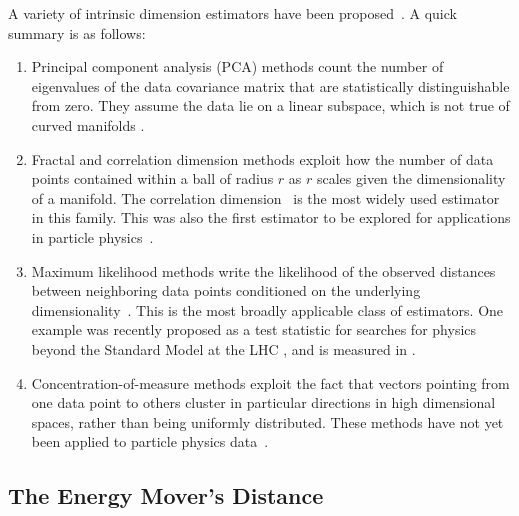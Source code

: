 A variety of intrinsic dimension estimators have been proposed~\cite{10.1109/T-C.1971.223208, PhysRevLett.50.346, NIPS2004_74934548, CERUTI20142569, Albergante:2019ijcnn}.
A quick summary is as follows:

\begin{enumerate}
  \item{
    Principal component analysis (PCA) methods count the number of eigenvalues of the data covariance matrix that are statistically distinguishable from zero.
    They assume the data lie on a linear subspace, which is not true of curved manifolds \cite{10.1109/T-C.1971.223208}.
  }
  \item{
    Fractal and correlation dimension methods exploit how the number of data points contained within a ball of radius $r$ as $r$ scales given the dimensionality of a manifold.
    The correlation dimension~\cite{PhysRevLett.50.346} is the most widely used estimator in this family.
    This was also the first estimator to be explored for applications in particle physics~\cite{Komiske:2019fks}.
  }
  \item{
    Maximum likelihood methods write the likelihood of the observed distances between neighboring data points conditioned on the underlying dimensionality~\cite{NIPS2004_74934548}.
    This is the most broadly applicable class of estimators.
    One example was recently proposed as a test statistic for searches for physics beyond the Standard Model at the LHC \cite{DAgnolo:2025qqr}, and is measured in .
  }
  \item{
    Concentration-of-measure methods exploit the fact that vectors pointing from one data point to others cluster in particular directions in high dimensional spaces, rather than being uniformly distributed.
    These methods have not yet been applied to particle physics data~\cite{CERUTI20142569, Albergante:2019ijcnn}.
  }
\end{enumerate}

\subsection{The Energy Mover's Distance}

